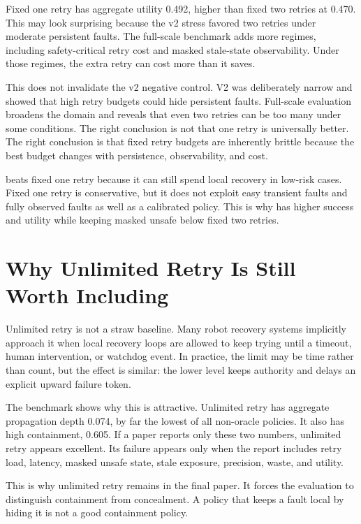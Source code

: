 Fixed one retry has aggregate utility 0.492, higher than fixed two retries at 0.470. This may look surprising because the v2 stress favored two retries under moderate persistent faults. The full-scale benchmark adds more regimes, including safety-critical retry cost and masked stale-state observability. Under those regimes, the extra retry can cost more than it saves.

This does not invalidate the v2 negative control. V2 was deliberately narrow and showed that high retry budgets could hide persistent faults. Full-scale evaluation broadens the domain and reveals that even two retries can be too many under some conditions. The right conclusion is not that one retry is universally better. The right conclusion is that fixed retry budgets are inherently brittle because the best budget changes with persistence, observability, and cost.

\method beats fixed one retry because it can still spend local recovery in low-risk cases. Fixed one retry is conservative, but it does not exploit easy transient faults and fully observed faults as well as a calibrated policy. This is why \method has higher success and utility while keeping masked unsafe below fixed two retries.

\section{Why Unlimited Retry Is Still Worth Including}

Unlimited retry is not a straw baseline. Many robot recovery systems implicitly approach it when local recovery loops are allowed to keep trying until a timeout, human intervention, or watchdog event. In practice, the limit may be time rather than count, but the effect is similar: the lower level keeps authority and delays an explicit upward failure token.

The benchmark shows why this is attractive. Unlimited retry has aggregate propagation depth 0.074, by far the lowest of all non-oracle policies. It also has high containment, 0.605. If a paper reports only these two numbers, unlimited retry appears excellent. Its failure appears only when the report includes retry load, latency, masked unsafe state, stale exposure, precision, waste, and utility.

This is why unlimited retry remains in the final paper. It forces the evaluation to distinguish containment from concealment. A policy that keeps a fault local by hiding it is not a good containment policy.

